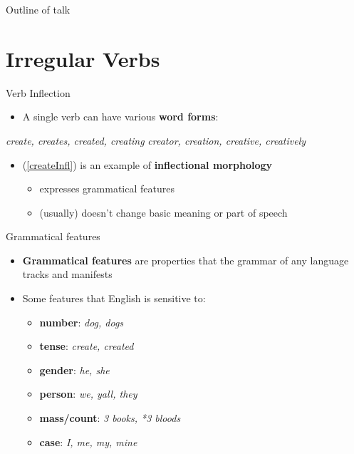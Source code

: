 \documentclass[10pt, compress]{beamer}
\begin{document}
\begin{frame}{Outline of talk}
	\tableofcontents
\end{frame}


\section{Irregular Verbs}
\begin{frame}{Verb Inflection}
	\begin{itemize}
		\item A single verb can have various {\bf word forms}:
	\end{itemize}

	\begin{exe}
			\begin{xlist}
			\ex\label{createInfl} \emph{create, creates, created, creating}
			\ex\label{createDer} \emph{creator, creation, creative, creatively}
		\end{xlist}
	\end{exe}

	\begin{itemize}
		\item (\ref{createInfl}) is an example of {\bf inflectional morphology}
		\begin{itemize}
			\item expresses grammatical features
			\item (usually) doesn't change basic meaning or part of speech
		\end{itemize}
	\end{itemize}
\end{frame}

\begin{frame}{Grammatical features}
	\begin{itemize}
		\item \textbf{Grammatical features} are properties that the grammar of any language tracks and manifests
		\item Some features that English is sensitive to:
		\begin{itemize}
			\item \textbf{number}: \emph{dog, dogs}
			\item \textbf{tense}: \emph{create, created}
			\item \textbf{gender}: \emph{he, she}
			\item \textbf{person}: \emph{we, yall, they}
			\item \textbf{mass/count}: \emph{3 books, *3 bloods}
			\item \textbf{case}: \emph{I, me, my, mine}
		\end{itemize}
	\end{itemize}
\end{frame}
\end{document}
